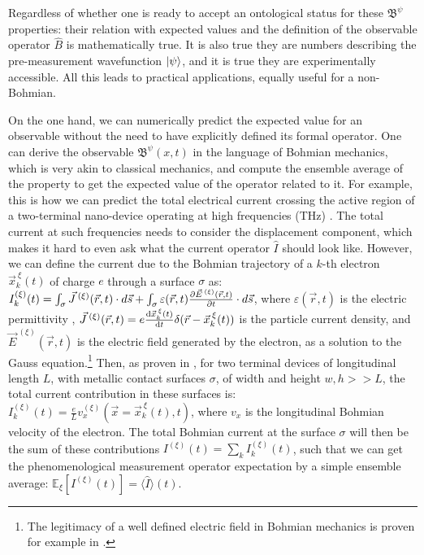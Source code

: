 \documentclass[11pt, a4paper]{article} %
\newcommand{\B}{\mathfrak{B}}
\begin{document}
Regardless of whether one is ready to accept an ontological status for these $\B^\psi$ properties: their relation with expected values and the definition of the observable operator $\hat{B}$ is mathematically true. It is also true they are numbers describing the pre-measurement wavefunction $\ket{\psi}$, and it is true they are experimentally accessible. All this leads to practical applications, equally useful for a non-Bohmian.

On the one hand, we can numerically predict the expected value for an observable without the need to have explicitly defined its formal operator. One can derive the observable $\B^\psi(x,t)$ in the language of Bohmian mechanics, which is very akin to classical mechanics, and compute the ensemble average of the property to get the expected value of the operator related to it. For example, this is how we can predict the total electrical current crossing the active region of a two-terminal nano-device operating at high frequencies (THz) \cite{equiv, Pel}. The total current at such frequencies needs to consider the displacement component, which makes it hard to even ask what the current operator $\hat{I}$ should look like. However, we can define the current due to the Bohmian trajectory of a $k$-th electron $\vec{x}_k^{\:\xi}(t)$ of charge $e$ through a surface $\sigma$ as: $I_k^{(\xi)}(t)=\int_\sigma \vec{J}^{\:(\xi)}(\vec{r},t)\cdot d\vec{s}+\int_\sigma \varepsilon(\vec{r},t)\pdv{\vec{E}^{\:(\xi)}(\vec{r},t)}{t}\cdot d\vec{s}$, where $\varepsilon(\vec{r},t)$ is the electric permittivity , $\vec{J}^{\:(\xi)}(\vec{r},t)=e\dv{\vec{x}_k^{\:\xi}(t)}{t}\delta(\vec{r}-\vec{x}_k^{\:\xi}(t))$ is the particle current density, and $\vec{E}^{\:(\xi)}(\vec{r},t)$ is the electric field generated by the electron, as a solution to the Gauss equation.\footnote{The legitimacy of a well defined electric field in Bohmian mechanics is proven for example in \cite{lightMatter}.} Then, as proven in \cite{Pel}, for two terminal devices of longitudinal length $L$, with metallic contact surfaces $\sigma$, of width and height $w,h>>L$, the total current contribution in these surfaces is: $I^{(\xi)}_k(t)=\frac{e}{L}v_x^{(\xi)}(\vec{x}=\vec{x}_k^{\:\xi}(t), t) $, where $v_x$ is the longitudinal Bohmian velocity of the electron. The total Bohmian current at the surface $\sigma$ will then be the sum of these contributions $I^{(\xi)}(t)=\sum_k I^{(\xi)}_k(t)$, such that we can get the phenomenological measurement operator expectation by a simple ensemble average: $\mathbb{E}_\xi [I^{(\xi)}(t)]=\langle \hat{I}\rangle(t)$. 
\end{document}
